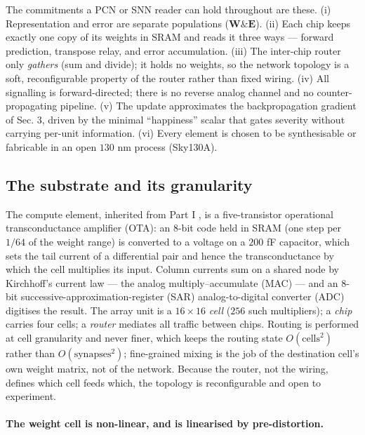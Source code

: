 \documentclass[11pt]{article}
\begin{document}
The commitments a PCN or SNN reader can hold throughout are these. (i)
Representation and error are separate populations (\(\bm W\&\bm E\)).
(ii) Each chip keeps exactly one copy of its weights in SRAM and reads
it three ways --- forward prediction, transpose relay, and error
accumulation. (iii) The inter-chip router only \emph{gathers} (sum and
divide); it holds no weights, so the network topology is a soft,
reconfigurable property of the router rather than fixed wiring. (iv) All
signalling is forward-directed; there is no reverse analog channel and
no counter-propagating pipeline. (v) The update approximates the
backpropagation gradient of Sec. 3, driven by the minimal ``happiness''
scalar that gates severity without carrying per-unit information. (vi)
Every element is chosen to be synthesisable or fabricable in an open
\(130\) nm process (Sky130A).

\hypertarget{the-substrate-and-its-granularity}{%
\subsection{The substrate and its
granularity}\label{the-substrate-and-its-granularity}}

The compute element, inherited from Part I \cite{dobney2026analog}, is
a five-transistor operational transconductance amplifier (OTA): an 8-bit
code held in SRAM (one step per \(1/64\) of the weight range) is
converted to a voltage on a \(200\) fF capacitor, which sets the tail
current of a differential pair and hence the transconductance by which
the cell multiplies its input. Column currents sum on a shared node by
Kirchhoff's current law --- the analog multiply--accumulate (MAC) ---
and an 8-bit successive-approximation-register (SAR) analog-to-digital
converter (ADC) digitises the result. The array unit is a \(16\times16\)
\emph{cell} (\(256\) such multipliers); a \emph{chip} carries four
cells; a \emph{router} mediates all traffic between chips. Routing is
performed at cell granularity and never finer, which keeps the routing
state \(O(\text{cells}^2)\) rather than \(O(\text{synapses}^2)\);
fine-grained mixing is the job of the destination cell's own weight
matrix, not of the network. Because the router, not the wiring, defines
which cell feeds which, the topology is reconfigurable and open to
experiment.

\hypertarget{the-weight-cell-is-non-linear-and-is-linearised-by-pre-distortion.}{%
\paragraph{The weight cell is non-linear, and is linearised by
pre-distortion.}\label{the-weight-cell-is-non-linear-and-is-linearised-by-pre-distortion.}}
\end{document}
